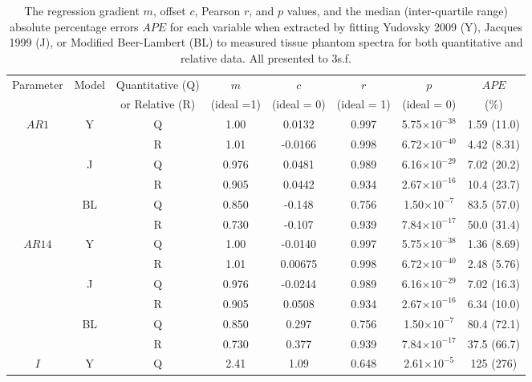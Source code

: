 \begin{subappendices}
\begin{table}[htb!]
    \centering
    \caption{The regression gradient $m$, offset $c$, Pearson $r$, and $p$ values, and the median (inter-quartile range) absolute percentage errors $APE$ for each variable when extracted by fitting Yudovsky 2009 (Y), Jacques 1999 (J), or Modified Beer-Lambert (BL) to measured tissue phantom spectra for both quantitative and relative data. All presented to 3s.f.}
    \begin{tabular}{|ccc|ccccc|}
        \hline
        Parameter & Model & Quantitative (Q) & $m$ & $c$ & $r$ & $p$ & $APE$ \\
        & & or Relative (R) & (ideal =1) & (ideal = 0) & (ideal = 1) & (ideal = 0) & (\%)\\
        \hline
        \multirow{6}{*}{$AR1$} & \multirow{2}{*}{Y} & Q & 1.00 & 0.0132 & 0.997 & 5.75$\times 10^{-38}$ & 1.59 (11.0) \\
        & & R & 1.01 & -0.0166 & 0.998 & 6.72$\times 10^{-40}$ & 4.42 (8.31) \\
        \cline{2-8}
        & \multirow{2}{*}{J} & Q & 0.976 & 0.0481 & 0.989 & 6.16$\times 10^{-29}$ & 7.02 (20.2) \\
        & & R & 0.905 & 0.0442 & 0.934 & 2.67$\times 10^{-16}$ & 10.4 (23.7) \\
        \cline{2-8}
        & \multirow{2}{*}{BL} & Q & 0.850 & -0.148 & 0.756 & 1.50$\times 10^{-7}$ & 83.5 (57.0) \\
        & & R & 0.730 & -0.107 & 0.939 & 7.84$\times 10^{-17}$ & 50.0 (31.4)\\
        \hline
        \multirow{6}{*}{$AR14$} & \multirow{2}{*}{Y} & Q & 1.00 & -0.0140 & 0.997 & 5.75$\times 10^{-38}$ & 1.36 (8.69) \\
        & & R & 1.01 & 0.00675 & 0.998 & 6.72$\times 10^{-40}$ & 2.48 (5.76) \\
        \cline{2-8}
        & \multirow{2}{*}{J} & Q & 0.976 & -0.0244 & 0.989 & 6.16$\times 10^{-29}$ & 7.02 (16.3) \\
        & & R & 0.905 & 0.0508 & 0.934 & 2.67$\times 10^{-16}$ & 6.34 (10.0) \\
        \cline{2-8}
        & \multirow{2}{*}{BL} & Q & 0.850 & 0.297 & 0.756 & 1.50$\times 10^{-7}$ & 80.4 (72.1) \\
        & & R & 0.730 & 0.377 & 0.939 & 7.84$\times 10^{-17}$ & 37.5 (66.7) \\
        \hline
        \multirow{6}{*}{$I$} & \multirow{2}{*}{Y} & Q & 2.41 & 1.09 & 0.648 & 2.61$\times 10^{-5}$ & 125 (276) \\

\end{tabular}
\end{table}
\end{subappendices}
